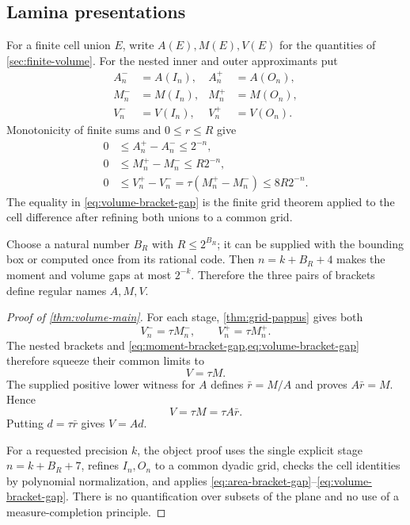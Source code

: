 \documentclass[11pt]{article}
\theoremstyle{definition}
\begin{document}
\subsection{Lamina presentations}

For a finite cell union $E$, write $A(E),M(E),V(E)$ for the quantities of
\cref{sec:finite-volume}.  For the nested inner and outer approximants put
\begin{align*}
 A_n^-&=A(I_n),& A_n^+&=A(O_n),\\
 M_n^-&=M(I_n),& M_n^+&=M(O_n),\\
 V_n^-&=V(I_n),& V_n^+&=V(O_n).
\end{align*}
Monotonicity of finite sums and $0\leq r\leq R$ give
\begin{align}
 0&\leq A_n^+-A_n^-\leq2^{-n},
 \label{eq:area-bracket-gap}\\
 0&\leq M_n^+-M_n^-\leq R2^{-n},
 \label{eq:moment-bracket-gap}\\
 0&\leq V_n^+-V_n^-
   =\tau(M_n^+-M_n^-)
   \leq8R2^{-n}.
 \label{eq:volume-bracket-gap}
\end{align}
The equality in \eqref{eq:volume-bracket-gap} is the finite grid theorem
applied to the cell difference after refining both unions to a common grid.

Choose a natural number $B_R$ with $R\leq2^{B_R}$; it can be supplied with the
bounding box or computed once from its rational code.  Then
$n=k+B_R+4$ makes the moment and volume gaps at most $2^{-k}$.  Therefore the
three pairs of brackets define regular names $A,M,V$.

\begin{proof}[Proof of \cref{thm:volume-main}]
For each stage, \cref{thm:grid-pappus} gives both
\[
 V_n^-=\tau M_n^-,\qquad V_n^+=\tau M_n^+.
\]
The nested brackets and \cref{eq:moment-bracket-gap,eq:volume-bracket-gap}
therefore squeeze their common limits to
\[
 V=\tau M.
\]
The supplied positive lower witness for $A$ defines
$\bar r=M/A$ and proves $A\bar r=M$.  Hence
\[
 V=\tau M=\tau A\bar r.
\]
Putting $d=\tau\bar r$ gives $V=Ad$.

For a requested precision $k$, the object proof uses the single explicit
stage $n=k+B_R+7$, refines $I_n,O_n$ to a common dyadic grid, checks the cell
identities by polynomial normalization, and applies
\eqref{eq:area-bracket-gap}--\eqref{eq:volume-bracket-gap}.  There is no
quantification over subsets of the plane and no use of a measure-completion
principle.
\end{proof}
\end{document}
